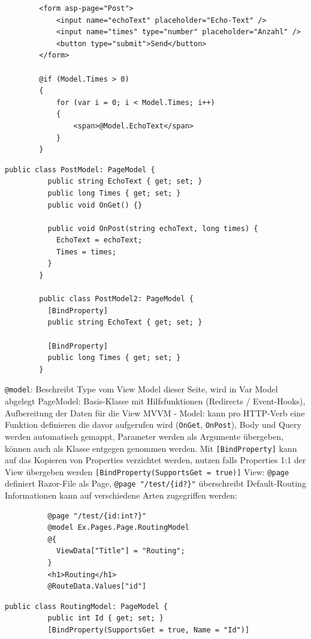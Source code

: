 \documentclass[10pt,landscape]{article}
\begin{document}
\begin{multicols}{2}
\begin{lstlisting}
        <form asp-page="Post">
            <input name="echoText" placeholder="Echo-Text" />
            <input name="times" type="number" placeholder="Anzahl" />
            <button type="submit">Send</button>
        </form>

        @if (Model.Times > 0)
        {
            for (var i = 0; i < Model.Times; i++)
            {
                <span>@Model.EchoText</span>
            }
        }
        \end{lstlisting}\begin{lstlisting}[style=CSharp]
        public class PostModel: PageModel {
          public string EchoText { get; set; }
          public long Times { get; set; }
          public void OnGet() {}

          public void OnPost(string echoText, long times) {
            EchoText = echoText;
            Times = times;
          }
        }

        public class PostModel2: PageModel {
          [BindProperty]
          public string EchoText { get; set; }

          [BindProperty]
          public long Times { get; set; }
        }
        \end{lstlisting}
        \lstinline{@model}: Beschreibt Type vom View Model dieser Seite, wird in Var Model abgelegt
        PageModel: Basis-Klasse mit Hilfsfunktionen (Redirects / Event-Hooks), Aufbereitung der Daten für die View
        MVVM - Model: kann pro HTTP-Verb eine Funktion definieren die davor aufgerufen wird (\lstinline{OnGet}, \lstinline{OnPost}), Body und Query werden automatisch gemappt, Parameter werden als Argumente übergeben, können auch als Klasse entgegen genommen werden.
        Mit \lstinline{[BindProperty]} kann auf das Kopieren von Properties verzichtet werden, nutzen falls Properties 1:1 der View übergeben werden \lstinline{[BindProperty(SupportsGet = true)]}
        View: \lstinline{@page} definiert Razor-File als Page, \lstinline[mathescape]!@page "/test/{id?}"! überschreibt Default-Routing Informationen
        kann auf verschiedene Arten zugegriffen werden:
        \begin{lstlisting}
          @page "/test/{id:int?}"
          @model Ex.Pages.Page.RoutingModel
          @{
            ViewData["Title"] = "Routing";
          }
          <h1>Routing</h1>
          @RouteData.Values["id"]
        \end{lstlisting}\begin{lstlisting}[style=CSharp]
        public class RoutingModel: PageModel {
          public int Id { get; set; }
          [BindProperty(SupportsGet = true, Name = "Id")]


\end{lstlisting}
\end{multicols}
\end{document}

